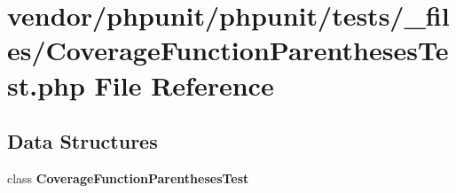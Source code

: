 \section{vendor/phpunit/phpunit/tests/\+\_\+files/\+Coverage\+Function\+Parentheses\+Test.php File Reference}
\label{phpunit_2tests_2__files_2_coverage_function_parentheses_test_8php}
\subsection*{Data Structures}
\begin{DoxyCompactItemize}
\item 
class {\bf Coverage\+Function\+Parentheses\+Test}
\end{DoxyCompactItemize}
